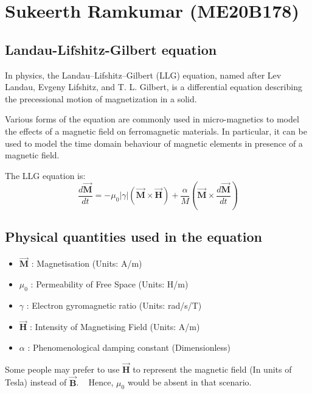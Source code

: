 \section{Sukeerth Ramkumar (ME20B178)}
{
	\vspace{0.5cm}
	\subsection{Landau-Lifshitz-Gilbert equation}
	{
		\vspace{0.25cm}
		In physics, the Landau–Lifshitz–Gilbert (LLG) equation, named after Lev Landau, Evgeny Lifshitz, and T. L. Gilbert, is a differential equation describing the precessional motion of magnetization in a solid. \newline

		Various forms of the equation are commonly used in micro-magnetics to model the effects of a magnetic field on ferromagnetic materials. In particular, it can be used to model the time domain behaviour of magnetic elements in presence of a magnetic field. \newline

		The LLG equation is:
		\begin{equation}
			\frac{d\overrightarrow{\mathbf{M}}}{dt}=-\mu_0|\gamma| \left(\overrightarrow{\mathbf{M}} \times \overrightarrow{\mathbf{H}}\right)+\frac{\alpha}{M}\left(\overrightarrow{\mathbf{M}} \times\frac{d\overrightarrow{\mathbf{M}}}{dt}\right)
			\label{eqn:LLG}
		\end{equation}
	
	}

	\subsection{Physical quantities used in the equation}
	{
		\vspace{0.25cm}
		\begin{itemize}
			\item $\overrightarrow{\mathbf{M}}$ : Magnetisation (Units: A/m)
			\item $\mu_0$ : Permeability of Free Space (Units: H/m)
			\item $\gamma$ : Electron gyromagnetic ratio (Units: rad/s/T)
			\item $\overrightarrow{\mathbf{H}}$ : Intensity of Magnetising Field (Units: A/m)	
			\item $\alpha$ : Phenomenological damping constant (Dimensionless)		
		\end{itemize}
		Some people may prefer to use $\overrightarrow{\mathbf{H}}$ to represent the magnetic field (In units of Tesla) instead of $\overrightarrow{\mathbf{B}}$. ~\cite{Mallinson20001976}
		Hence, $\mu_0$ would be absent in that scenario.
	}

}
